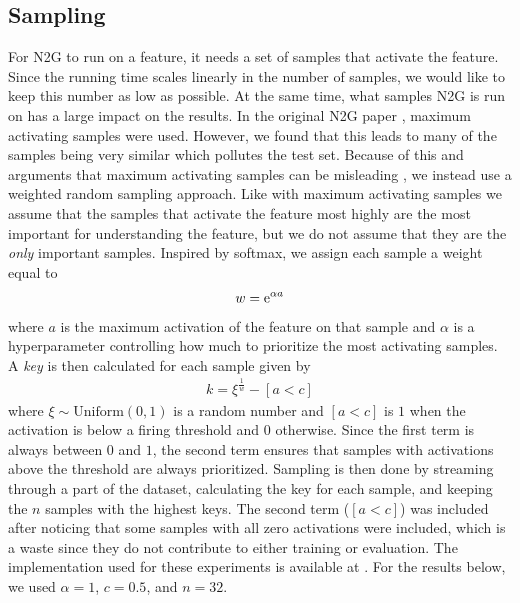 \subsection{Sampling}
\label{sec:sampling}
For N2G to run on a feature, it needs a set of samples that activate the feature.
Since the running time scales linearly in the number of samples, we would like to keep this number as low as possible.
At the same time, what samples N2G is run on has a large impact on the results.
In the original N2G paper \parencite{foote_neuron_2023}, maximum activating samples were used.
However, we found that this leads to many of the samples being very similar which pollutes the test set.
Because of this and arguments that maximum activating samples can be misleading \parencite{bolukbasi_interpretability_2021}, we instead use a weighted random sampling approach.
Like with maximum activating samples we assume that the samples that activate the feature most highly are the most important for understanding the feature, but we do not assume that they are the \emph{only} important samples.
Inspired by softmax, we assign each sample a weight equal to
\begin{align*}
    w=\mathrm{e}^{\alpha a}
\end{align*}
where $a$ is the maximum activation of the feature on that sample and $\alpha$ is a hyperparameter controlling how much to prioritize the most activating samples.
A \emph{key} is then calculated for each sample given by
\begin{align*}
    k=\xi^{\frac1w}-[a<c]
\end{align*}
where $\xi\sim\mathrm{Uniform}(0,1)$ is a random number and $[a<c]$ is $1$ when the activation is below a firing threshold and $0$ otherwise.
Since the first term is always between $0$ and $1$, the second term ensures that samples with activations above the threshold are always prioritized.
Sampling is then done by streaming through a part of the dataset, calculating the key for each sample, and keeping the $n$ samples with the highest keys.
The second term ($[a<c]$) was included after noticing that some samples with all zero activations were included, which is a waste since they do not contribute to either training or evaluation.
The implementation used for these experiments is available at .
For the results below, we used $\alpha=1$, $c=0.5$, and $n=32$.

